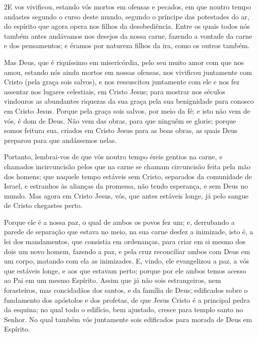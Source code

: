 \medskip

\lettrine{2} E vos vivificou, estando vós mortos em ofensas e
pecados, em que noutro tempo andastes segundo o curso deste
mundo, segundo o príncipe das potestades do ar, do espírito que
agora opera nos filhos da desobediência. Entre os quais todos
nós também antes andávamos nos desejos da nossa carne, fazendo a
vontade da carne e dos pensamentos; e éramos por natureza filhos da
ira, como os outros também.

Mas Deus, que é riquíssimo em misericórdia, pelo seu muito amor
com que nos amou, estando nós ainda mortos em nossas ofensas,
nos vivificou juntamente com Cristo (pela graça sois salvos), e
nos ressuscitou juntamente com ele e nos fez assentar nos lugares
celestiais, em Cristo Jesus; para mostrar nos séculos vindouros
as abundantes riquezas da sua graça pela sua benignidade para
conosco em Cristo Jesus. Porque pela graça sois salvos, por meio
da fé; e isto não vem de vós, é dom de Deus. Não vem das obras,
para que ninguém se glorie; porque somos feitura sua, criados
em Cristo Jesus para as boas obras, as quais Deus preparou para que
andássemos nelas.

Portanto, lembrai-vos de que vós noutro tempo éreis gentios na
carne, e chamados incircuncisão pelos que na carne se chamam
circuncisão feita pela mão dos homens; que naquele tempo
estáveis sem Cristo, separados da comunidade de Israel, e estranhos
às alianças da promessa, não tendo esperança, e sem Deus no mundo.
Mas agora em Cristo Jesus, vós, que antes estáveis longe, já
pelo sangue de Cristo chegastes perto.

Porque ele é a nossa paz, o qual de ambos os povos fez um; e,
derrubando a parede de separação que estava no meio, na sua
carne desfez a inimizade, isto é, a lei dos mandamentos, que
consistia em ordenanças, para criar em si mesmo dos dois um novo
homem, fazendo a paz, e pela cruz reconciliar ambos com Deus
em um corpo, matando com ela as inimizades. E, vindo, ele
evangelizou a paz, a vós que estáveis longe, e aos que estavam
perto; porque por ele ambos temos acesso ao Pai em um mesmo
Espírito. Assim que já não sois estrangeiros, nem
forasteiros, mas concidadãos dos santos, e da família de Deus;
edificados sobre o fundamento dos apóstolos e dos profetas,
de que Jesus Cristo é a principal pedra da esquina; no qual
todo o edifício, bem ajustado, cresce para templo santo no Senhor.
No qual também vós juntamente sois edificados para morada de
Deus em Espírito.

\medskip

